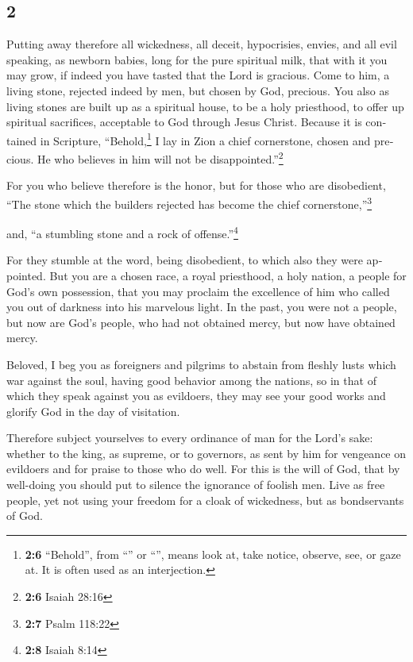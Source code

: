 \begin{paracol}{2}
\switchcolumn
\begin{otherlanguage}{english}

\hypertarget{section-3}{%
\section{2}\label{section-3}}

 Putting away therefore all wickedness, all deceit,
hypocrisies, envies, and all evil speaking,  as newborn
babies, long for the pure spiritual milk, that with it you may grow,
 if indeed you have tasted that the Lord is gracious.
 Come to him, a living stone, rejected indeed by men, but
chosen by God, precious.  You also as living stones are
built up as a spiritual house, to be a holy priesthood, to offer up
spiritual sacrifices, acceptable to God through Jesus Christ.
 Because it is contained in Scripture,
``Behold,\footnote{\textbf{2:6} ``Behold'', from ``'' or
  ``'', means look at, take notice, observe, see, or gaze
  at. It is often used as an interjection.} I lay in Zion a chief
cornerstone, chosen and precious. He who believes in him will not be
disappointed.''\footnote{\textbf{2:6} Isaiah 28:16}

 For you who believe therefore is the honor, but for those
who are disobedient, ``The stone which the builders rejected has become
the chief cornerstone,''\footnote{\textbf{2:7} Psalm 118:22}

 and, ``a stumbling stone and a rock of
offense.''\footnote{\textbf{2:8} Isaiah 8:14}

For they stumble at the word, being disobedient, to which also they were
appointed.  But you are a chosen race, a royal priesthood,
a holy nation, a people for God's own possession, that you may proclaim
the excellence of him who called you out of darkness into his marvelous
light.  In the past, you were not a people, but now are
God's people, who had not obtained mercy, but now have obtained mercy.

 Beloved, I beg you as foreigners and pilgrims to abstain
from fleshly lusts which war against the soul,  having
good behavior among the nations, so in that of which they speak against
you as evildoers, they may see your good works and glorify God in the
day of visitation.

 Therefore subject yourselves to every ordinance of man
for the Lord's sake: whether to the king, as supreme,  or
to governors, as sent by him for vengeance on evildoers and for praise
to those who do well.  For this is the will of God, that
by well-doing you should put to silence the ignorance of foolish men.
 Live as free people, yet not using your freedom for a
cloak of wickedness, but as bondservants of God.


\end{otherlanguage}
\end{paracol}
